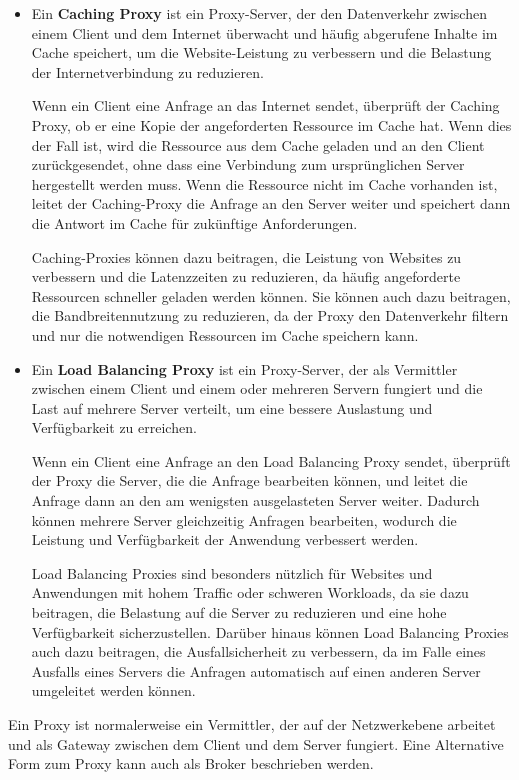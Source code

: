 \documentclass[../vs-script-first-v01.tex]{subfiles}
\begin{document}
\begin{itemize}
\item Ein \textbf{Caching Proxy} ist ein Proxy-Server, der den Datenverkehr zwischen einem Client und dem Internet überwacht und häufig abgerufene Inhalte im Cache speichert, um die Website-Leistung zu verbessern und die Belastung der Internetverbindung zu reduzieren.

Wenn ein Client eine Anfrage an das Internet sendet, überprüft der Caching Proxy, ob er eine Kopie der angeforderten Ressource im Cache hat. Wenn dies der Fall ist, wird die Ressource aus dem Cache geladen und an den Client zurückgesendet, ohne dass eine Verbindung zum ursprünglichen Server hergestellt werden muss. Wenn die Ressource nicht im Cache vorhanden ist, leitet der Caching-Proxy die Anfrage an den Server weiter und speichert dann die Antwort im Cache für zukünftige Anforderungen.

Caching-Proxies können dazu beitragen, die Leistung von Websites zu verbessern und die Latenzzeiten zu reduzieren, da häufig angeforderte Ressourcen schneller geladen werden können. Sie können auch dazu beitragen, die Bandbreitennutzung zu reduzieren, da der Proxy den Datenverkehr filtern und nur die notwendigen Ressourcen im Cache speichern kann.
\item Ein \textbf{Load Balancing Proxy} ist ein Proxy-Server, der als Vermittler zwischen einem Client und einem oder mehreren Servern fungiert und die Last auf mehrere Server verteilt, um eine bessere Auslastung und Verfügbarkeit zu erreichen.

Wenn ein Client eine Anfrage an den Load Balancing Proxy sendet, überprüft der Proxy die Server, die die Anfrage bearbeiten können, und leitet die Anfrage dann an den am wenigsten ausgelasteten Server weiter. Dadurch können mehrere Server gleichzeitig Anfragen bearbeiten, wodurch die Leistung und Verfügbarkeit der Anwendung verbessert werden.

Load Balancing Proxies sind besonders nützlich für Websites und Anwendungen mit hohem Traffic oder schweren Workloads, da sie dazu beitragen, die Belastung auf die Server zu reduzieren und eine hohe Verfügbarkeit sicherzustellen. Darüber hinaus können Load Balancing Proxies auch dazu beitragen, die Ausfallsicherheit zu verbessern, da im Falle eines Ausfalls eines Servers die Anfragen automatisch auf einen anderen Server umgeleitet werden können.
\end{itemize}
Ein Proxy ist normalerweise ein Vermittler, der  auf der Netzwerkebene arbeitet und als Gateway zwischen dem Client und dem Server fungiert. Eine Alternative Form zum Proxy kann auch als Broker beschrieben werden. 
\end{document}
